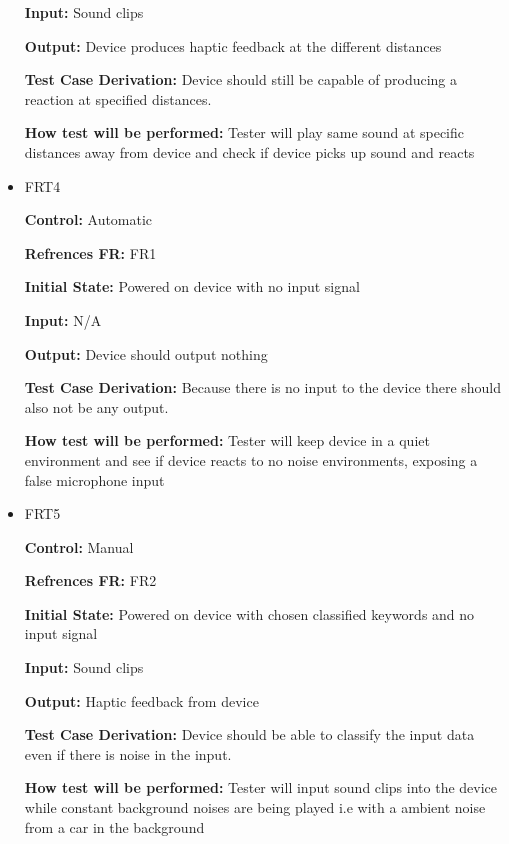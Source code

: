 \documentclass[12pt, titlepage]{article}
\begin{document}
\begin{itemize}
\textbf{Input:} Sound clips
					
\textbf{Output:} Device produces haptic feedback at the different distances

\textbf{Test Case Derivation:} Device should still be capable of producing a reaction at specified distances.
					
\textbf{How test will be performed:}  Tester will play same sound at specific distances away from device and check if device picks up sound and reacts


\item{FRT4}

\textbf{Control:} Automatic

\textbf{Refrences FR:} FR1 					

\textbf{Initial State:} Powered on device with no input signal 
					
\textbf{Input:} N/A
					
\textbf{Output:} Device should output nothing

\textbf{Test Case Derivation:} Because there is no input to the device there should also not be any output.
					
\textbf{How test will be performed:} Tester will keep device in a quiet environment and see if device reacts to no noise environments, exposing a false microphone input 


\item{FRT5}

\textbf{Control:} Manual

\textbf{Refrences FR:} FR2 					

\textbf{Initial State:} Powered on device with chosen classified keywords and no input signal 
					
\textbf{Input:} Sound clips
					
\textbf{Output:} Haptic feedback from device

\textbf{Test Case Derivation:} Device should be able to classify the input data even if there is noise in the input.
					
\textbf{How test will be performed:} Tester will input sound clips into the device while constant background noises are being played i.e with a ambient noise from a car in the background


\end{itemize}
\end{document}
